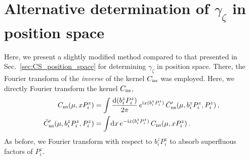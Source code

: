 \documentclass[11pt,a4paper]{article}
\DeclareRobustCommand{\sec}[1]{Sec.~\ref{sec:#1}}
\newcommand{\df}{\mathrm{d}}
\newcommand{\img}{\mathrm{i}}
\newcommand{\nn}{\nonumber}
\newcommand{\ns}{{\rm ns}}
\begin{document}
\section{\boldmath Alternative determination of \texorpdfstring{$\gamma_\zeta$}{gamma\_zeta} in position space}
\label{app:CS_position_space}

Here, we present a slightly modified method compared to that presented in \sec{CS_position_space} for determining $\gamma_\zeta$ in position space.
There, the Fourier transform of the \emph{inverse} of the kernel $C_\ns$ was employed.
Here, we directly Fourier transform the kernel $C_\ns$,
\begin{align} \label{eq:FT_C_alt}
 C_\ns(\mu, x P^z_i) &= \int\frac{\df (b^z_i P^z_i)}{2\pi} \, e^{\img x (b^z_i P^z_i)} \, \bar C_\ns^\prime(\mu, b^z_i P^z_i, P^z_i)
\,,\nn\\
 \bar C_\ns^\prime(\mu, b^z_i P^z_i, P^z_i) &= \int\!\df x \, e^{-\img x (b^z_i P^z_i)} \, C_\ns(\mu, x P^z_i)
\,.\end{align}
As before, we Fourier transform with respect to $b^z_i P^z_i$ to absorb superfluous factors of $P^z_i$.
\end{document}
